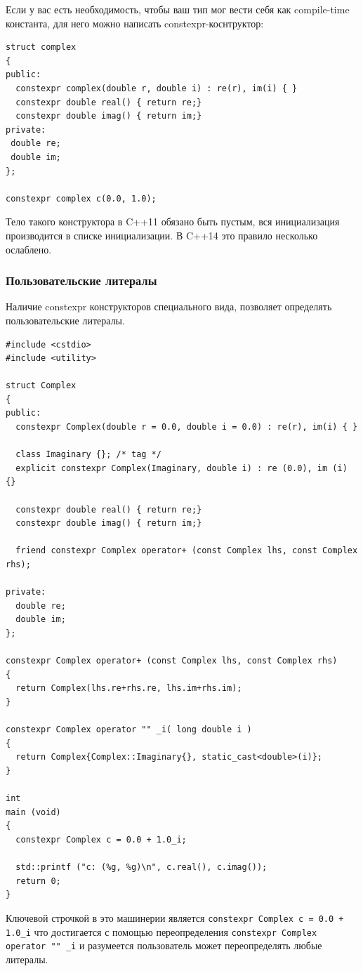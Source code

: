 \documentclass[a4paper,12pt,oneside]{article}
\begin{document}
Если у вас есть необходимость, чтобы ваш тип мог вести себя как compile-time константа, для него можно написать constexpr-коснтруктор:

\begin{lstlisting}
struct complex
{
public:
  constexpr complex(double r, double i) : re(r), im(i) { }
  constexpr double real() { return re;}
  constexpr double imag() { return im;}
private:
 double re;
 double im;
};

constexpr complex c(0.0, 1.0);
\end{lstlisting}

Тело такого конструктора в C++11 обязано быть пустым, вся инициализация производится в списке инициализации. В C++14 это правило несколько ослаблено.

\subsubsection{Пользовательские литералы}

Наличие constexpr конструкторов специального вида, позволяет определять пользовательские литералы.

\begin{lstlisting}
#include <cstdio>
#include <utility>

struct Complex
{
public:
  constexpr Complex(double r = 0.0, double i = 0.0) : re(r), im(i) { }

  class Imaginary {}; /* tag */
  explicit constexpr Complex(Imaginary, double i) : re (0.0), im (i) {}

  constexpr double real() { return re;}
  constexpr double imag() { return im;}

  friend constexpr Complex operator+ (const Complex lhs, const Complex rhs);

private:
  double re;
  double im;
};

constexpr Complex operator+ (const Complex lhs, const Complex rhs)
{
  return Complex(lhs.re+rhs.re, lhs.im+rhs.im);
}

constexpr Complex operator "" _i( long double i )
{
  return Complex{Complex::Imaginary{}, static_cast<double>(i)};
}

int
main (void)
{
  constexpr Complex c = 0.0 + 1.0_i;

  std::printf ("c: (%g, %g)\n", c.real(), c.imag());
  return 0;
}
\end{lstlisting}

Ключевой строчкой в это машинерии является \lstinline!constexpr Complex c = 0.0 + 1.0_i! что достигается с помощью переопределения \lstinline!constexpr Complex operator "" _i! и разумеется пользователь может переопределять любые литералы.
\end{document}
